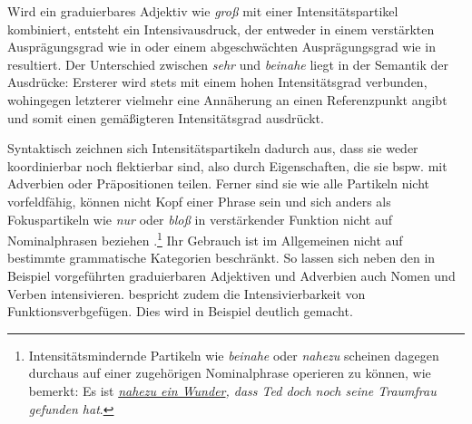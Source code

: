 \noindent Wird ein graduierbares Adjektiv wie \textit{groß} mit einer Intensitätspartikel kombiniert, entsteht ein Intensivausdruck, der entweder in einem verstärkten Ausprägungsgrad wie in  oder einem abgeschwächten Ausprägungsgrad wie in  resultiert. Der Unterschied zwischen \textit{sehr} und \textit{beinahe} liegt in der Semantik der Ausdrücke: Ersterer wird stets mit einem hohen Intensitätsgrad verbunden, wohingegen letzterer vielmehr eine Annäherung an einen Referenzpunkt angibt und somit einen gemäßigteren {Intensitätsgrad ausdrückt}.

Syntaktisch zeichnen sich Intensitätspartikeln dadurch aus, dass sie weder koordinierbar noch flektierbar sind, also durch Eigenschaften, die sie bspw. mit Adverbien oder Präpositionen teilen. Ferner sind sie wie alle Partikeln nicht vorfeldfähig, können nicht Kopf einer Phrase sein und sich anders als Fokuspartikeln wie \textit{nur} oder \textit{bloß} in verstärkender Funktion nicht auf Nominalphrasen beziehen {\citep[vgl.][56]{Zifonun.1997}}.\footnote{Intensitätsmindernde Partikeln wie \textit{beinahe} oder \textit{nahezu} scheinen dagegen durchaus auf einer zugehörigen Nominalphrase operieren zu können, wie \citet[86]{Westpfahl.2020} bemerkt: Es ist \textit{\uline{nahezu ein Wunder}, dass Ted doch noch seine Traumfrau gefunden hat}.} Ihr Gebrauch ist im Allgemeinen nicht auf bestimmte grammatische Kategorien beschränkt. So lassen sich neben den in {Beispiel } vorgeführten graduierbaren Adjektiven und Adverbien auch Nomen und Verben intensivieren. \citet[20ff.]{Laitenberger.2016} bespricht zudem die Intensivierbarkeit von Funktionsverbgefügen. Dies wird in Beispiel  deutlich gemacht.

